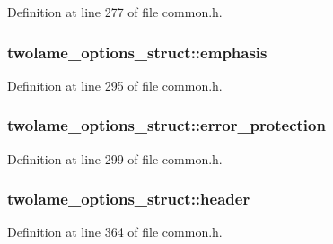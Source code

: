 Definition at line 277 of file common.\+h.

\subsubsection[{\texorpdfstring{emphasis}{emphasis}}]{ twolame\+\_\+options\+\_\+struct\+::emphasis}\hypertarget{structtwolame__options__struct_aaef1bd9b6ed9084ad137b450b1744dc3}{}\label{structtwolame__options__struct_aaef1bd9b6ed9084ad137b450b1744dc3}


Definition at line 295 of file common.\+h.

\subsubsection[{\texorpdfstring{error\+\_\+protection}{error_protection}}]{ twolame\+\_\+options\+\_\+struct\+::error\+\_\+protection}\hypertarget{structtwolame__options__struct_afdb13bca150737358592a608804b2ad3}{}\label{structtwolame__options__struct_afdb13bca150737358592a608804b2ad3}


Definition at line 299 of file common.\+h.

\subsubsection[{\texorpdfstring{header}{header}}]{ twolame\+\_\+options\+\_\+struct\+::header}\hypertarget{structtwolame__options__struct_a50fa0b33674f61d8e3386b3e8d54b78c}{}\label{structtwolame__options__struct_a50fa0b33674f61d8e3386b3e8d54b78c}


Definition at line 364 of file common.\+h.

